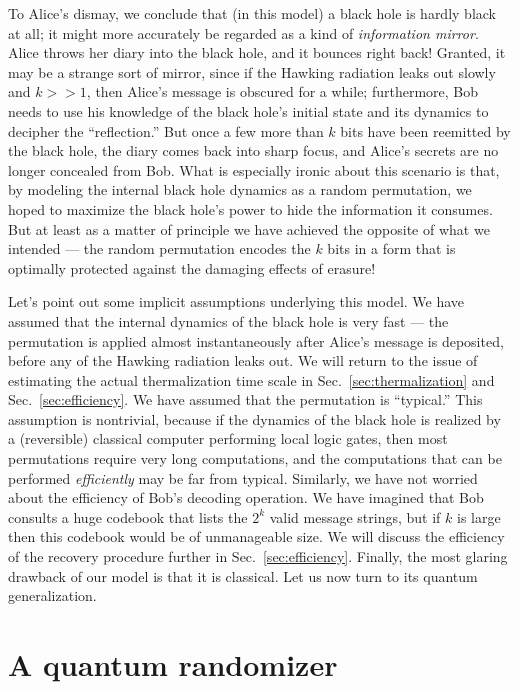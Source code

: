 \documentclass[12pt]{article}
\begin{document}
To Alice's dismay, we conclude that (in this model) a black hole is hardly black at all; it might more accurately be regarded as a kind of {\em information mirror}. Alice throws her diary into the black hole, and it bounces right back! Granted, it may be a strange sort of mirror, since if the Hawking radiation leaks out slowly and $k >> 1$, then Alice's message is obscured for a while; furthermore, Bob needs to use his knowledge of the black hole's initial state and its dynamics to decipher the ``reflection.'' But once a few more than $k$ bits have been reemitted by the black hole, the diary comes back into sharp focus, and Alice's secrets are no longer concealed from Bob. What is especially ironic about this scenario is that, by modeling the internal black hole dynamics as a random permutation, we hoped to maximize the black hole's power to hide the information it consumes. But at least as a matter of principle we have achieved the opposite of what we intended ---  the random permutation encodes the $k$ bits in a form that is optimally protected against the damaging effects of erasure! 

Let's point out some implicit assumptions underlying this model. We have assumed that the internal dynamics of the black hole is very fast --- the permutation is applied almost instantaneously after Alice's message is deposited, before any of the Hawking radiation leaks out. We will return to the issue of estimating the actual thermalization time scale in Sec.~\ref{sec:thermalization} and Sec.~\ref{sec:efficiency}. We have assumed that the permutation is ``typical.'' This assumption is nontrivial, because if the dynamics of the black hole is realized by a (reversible) classical computer performing local logic gates, then most permutations require very long computations, and the computations that can be performed {\em efficiently} may be far from typical. Similarly, we have not worried about the efficiency of Bob's decoding operation. We have imagined that Bob consults a huge codebook that lists the $2^k$ valid message strings, but if $k$ is large then this codebook would be of unmanageable size. We will discuss the efficiency of the recovery procedure further in Sec.~\ref{sec:efficiency}. Finally, the most glaring drawback of our model is that it is classical. Let us now turn to its quantum generalization. 


\section{A quantum randomizer}
\label{sec:quantum}
\end{document}
